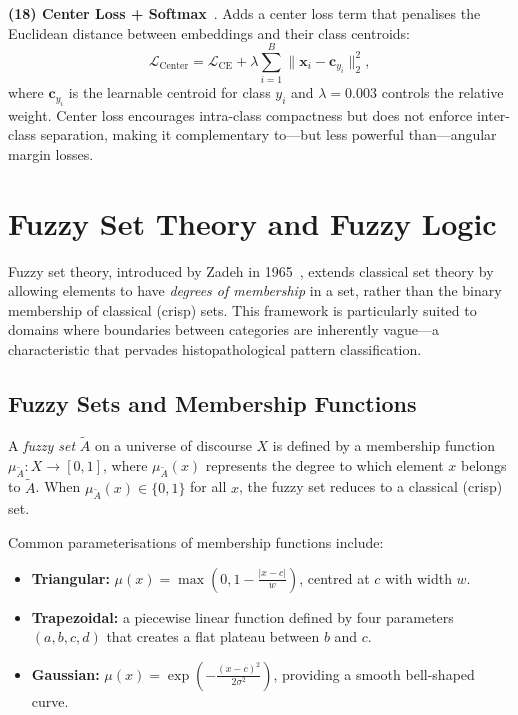 \textbf{(18) Center Loss + Softmax}~\cite{wen2016centerloss}.
Adds a center loss term that penalises the Euclidean distance between embeddings and their class centroids:
\begin{equation}
\label{eq:center_loss}
\mathcal{L}_{\text{Center}} = \mathcal{L}_{\text{CE}} + \lambda \sum_{i=1}^{B} \|\mathbf{x}_i - \mathbf{c}_{y_i}\|_2^2,
\end{equation}
where $\mathbf{c}_{y_i}$ is the learnable centroid for class $y_i$ and $\lambda = 0.003$ controls the relative weight.
Center loss encourages intra-class compactness but does not enforce inter-class separation, making it complementary to---but less powerful than---angular margin losses.


\section{Fuzzy Set Theory and Fuzzy Logic}
\label{sec:bg:fuzzy}

Fuzzy set theory, introduced by Zadeh in 1965~\cite{zadeh1965fuzzy}, extends classical set theory by allowing elements to have \emph{degrees of membership} in a set, rather than the binary membership of classical (crisp) sets.
This framework is particularly suited to domains where boundaries between categories are inherently vague---a characteristic that pervades histopathological pattern classification.

\subsection{Fuzzy Sets and Membership Functions}
\label{sec:bg:fuzzy:sets}

A \emph{fuzzy set} $\tilde{A}$ on a universe of discourse $X$ is defined by a membership function $\mu_{\tilde{A}}: X \to [0, 1]$, where $\mu_{\tilde{A}}(x)$ represents the degree to which element $x$ belongs to $\tilde{A}$.
When $\mu_{\tilde{A}}(x) \in \{0, 1\}$ for all $x$, the fuzzy set reduces to a classical (crisp) set.

Common parameterisations of membership functions include:
\begin{itemize}
    \item \textbf{Triangular:} $\mu(x) = \max\left(0, 1 - \frac{|x - c|}{w}\right)$, centred at $c$ with width $w$.
    \item \textbf{Trapezoidal:} a piecewise linear function defined by four parameters $(a, b, c, d)$ that creates a flat plateau between $b$ and $c$.
    \item \textbf{Gaussian:} $\mu(x) = \exp\left(-\frac{(x-c)^2}{2\sigma^2}\right)$, providing a smooth bell-shaped curve.
\end{itemize}

